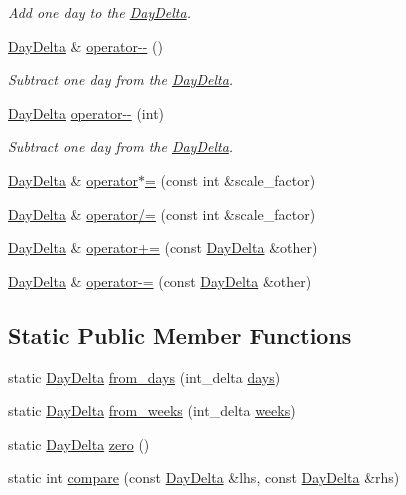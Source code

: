 \begin{DoxyCompactItemize}
\begin{DoxyCompactList}\small\item\em \-Add one day to the \hyperlink{structDayDelta}{\-Day\-Delta}. \end{DoxyCompactList}\item 
\hyperlink{structDayDelta}{\-Day\-Delta} \& \hyperlink{structDayDelta_aa0ca3c6a73df1946150a1c7e555b79b9}{operator-\/-\/} ()
\begin{DoxyCompactList}\small\item\em \-Subtract one day from the \hyperlink{structDayDelta}{\-Day\-Delta}. \end{DoxyCompactList}\item 
\hyperlink{structDayDelta}{\-Day\-Delta} \hyperlink{structDayDelta_a7e0ffb0cc2aeff7414fee2edfb8e3424}{operator-\/-\/} (int)
\begin{DoxyCompactList}\small\item\em \-Subtract one day from the \hyperlink{structDayDelta}{\-Day\-Delta}. \end{DoxyCompactList}\item 
\hyperlink{structDayDelta}{\-Day\-Delta} \& \hyperlink{structDayDelta_a4312a7090a3365dc3646f91f44ae7654}{operator$\ast$=} (const int \&scale\-\_\-factor)
\item 
\hyperlink{structDayDelta}{\-Day\-Delta} \& \hyperlink{structDayDelta_a892e28fb54b113684d1f5078d6f607c8}{operator/=} (const int \&scale\-\_\-factor)
\item 
\hyperlink{structDayDelta}{\-Day\-Delta} \& \hyperlink{structDayDelta_a081325e9acba450f7446d1d59ed65518}{operator+=} (const \hyperlink{structDayDelta}{\-Day\-Delta} \&other)
\item 
\hyperlink{structDayDelta}{\-Day\-Delta} \& \hyperlink{structDayDelta_a886f81ff8427ad7712a246fcd3b139f7}{operator-\/=} (const \hyperlink{structDayDelta}{\-Day\-Delta} \&other)
\end{DoxyCompactItemize}
\subsection*{\-Static \-Public \-Member \-Functions}
\begin{DoxyCompactItemize}
\item 
static \hyperlink{structDayDelta}{\-Day\-Delta} \hyperlink{structDayDelta_a7421a2d8448dd7d5329d72d0d6a04cbd}{from\-\_\-days} (int\-\_\-delta \hyperlink{structDayDelta_af7d15328d1c97bbd3316f014c69a6e3b}{days})
\item 
static \hyperlink{structDayDelta}{\-Day\-Delta} \hyperlink{structDayDelta_a871bbf34275016d74c7ef8c8777c3258}{from\-\_\-weeks} (int\-\_\-delta \hyperlink{structDayDelta_a48287489831fa9ec472451487908e663}{weeks})
\item 
static \hyperlink{structDayDelta}{\-Day\-Delta} \hyperlink{structDayDelta_acfcc09473305041a930a1ea6a3c20409}{zero} ()
\item 
static int \hyperlink{structDayDelta_a1059465fe1c1bfb8d7136ad887b00d30}{compare} (const \hyperlink{structDayDelta}{\-Day\-Delta} \&lhs, const \hyperlink{structDayDelta}{\-Day\-Delta} \&rhs)
\end{DoxyCompactItemize}
